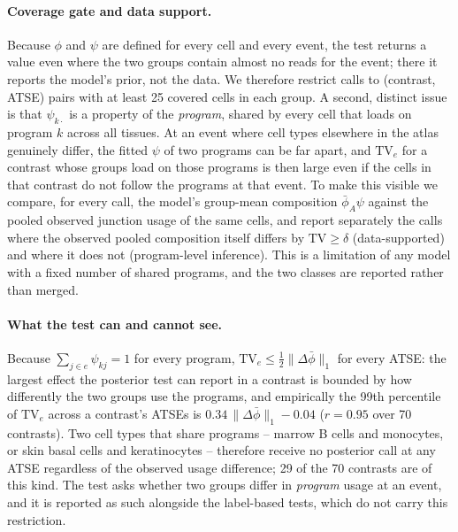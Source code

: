 \paragraph{Coverage gate and data support.} Because $\phi$ and $\psi$ are defined for every cell and every event, the test returns a value even where the two groups contain almost no reads for the event; there it reports the model's prior, not the data. We therefore restrict calls to (contrast, ATSE) pairs with at least 25 covered cells in each group. A second, distinct issue is that $\psi_{k\cdot}$ is a property of the \emph{program}, shared by every cell that loads on program $k$ across all tissues. At an event where cell types elsewhere in the atlas genuinely differ, the fitted $\psi$ of two programs can be far apart, and $\mathrm{TV}_e$ for a contrast whose groups load on those programs is then large even if the cells in that contrast do not follow the programs at that event. To make this visible we compare, for every call, the model's group-mean composition $\bar\phi_A\psi$ against the pooled observed junction usage of the same cells, and report separately the calls where the observed pooled composition itself differs by $\mathrm{TV} \ge \delta$ (data-supported) and where it does not (program-level inference). This is a limitation of any model with a fixed number of shared programs, and the two classes are reported rather than merged.

\paragraph{What the test can and cannot see.} Because $\sum_{j\in e}\psi_{kj} = 1$ for every program, $\mathrm{TV}_e \le \tfrac12\|\Delta\bar\phi\|_1$ for every ATSE: the largest effect the posterior test can report in a contrast is bounded by how differently the two groups use the programs, and empirically the 99th percentile of $\mathrm{TV}_e$ across a contrast's ATSEs is $0.34\,\|\Delta\bar\phi\|_1 - 0.04$ ($r = 0.95$ over 70 contrasts). Two cell types that share programs -- marrow B cells and monocytes, or skin basal cells and keratinocytes -- therefore receive no posterior call at any ATSE regardless of the observed usage difference; 29 of the 70 contrasts are of this kind. The test asks whether two groups differ in \emph{program} usage at an event, and it is reported as such alongside the label-based tests, which do not carry this restriction.

